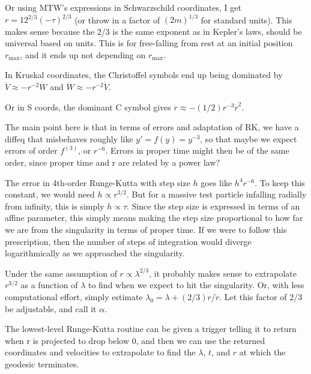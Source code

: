 \documentclass{article}
\begin{document}
Or using MTW's expressions in Schwarzschild coordinates, I get
$r=12^{2/3}(-\tau)^{2/3}$ (or throw in a factor of $(2m)^{1/3}$ for
standard units). This makes sense because the 2/3 is the same exponent
as in Kepler's laws, should be universal based on units. This is for free-falling
from rest at an initial position $r_\text{max}$, and it ends up not depending
on $r_\text{max}$.

In Kruskal coordinates, the Christoffel symbols end up being dominated by
$\ddot{V}\approx -r^{-2}\dot{W}$ and $\ddot{W}\approx -r^{-2}\dot{V}$.

Or in S coords, the dominant C symbol gives $\ddot{r}\approx -(1/2)r^{-3}\dot{r}^2$.

The main point here is that in terms of errors and adaptation of RK,
we have a diffeq that misbehaves roughly like $y'=f(y)=y^{-3}$, so that
maybe we expect errors of order $f^{(3)}$, or $r^{-6}$. Errors in proper
time might then be of the same order, since proper time and r are related
by a power law?

The error in 4th-order Runge-Kutta with step size $h$ goes like $h^4r^{-6}$.
To keep this constant, we would need $h\propto r^{3/2}$. But for a massive
test particle infalling radially from infinity, this is simply $h\propto \tau$. Since the
step size is expressed in terms of an affine parameter, this simply means
making the step size proportional to how far we are from the singularity in terms of proper time.
If we were to follow this prescription, then the number of steps of integration would diverge
logarithmically as we approached the singularity.

Under the same assumption of $r\propto\lambda^{2/3}$, it probably makes sense
to extrapolate $r^{3/2}$ as a function of $\lambda$ to find when we expect
to hit the singularity. Or, with less computational effort, simply estimate
$\lambda_0=\lambda+(2/3)r/\dot{r}$. Let this factor of 2/3 be adjustable, and
call it $\alpha$.

The lowest-level Runge-Kutta routine can be given a trigger telling it to
return when r is projected to drop below 0, and then we can use the returned
coordinates and velocities to extrapolate to find the $\lambda$, $t$, and $r$
at which the geodesic terminates.
\end{document}
